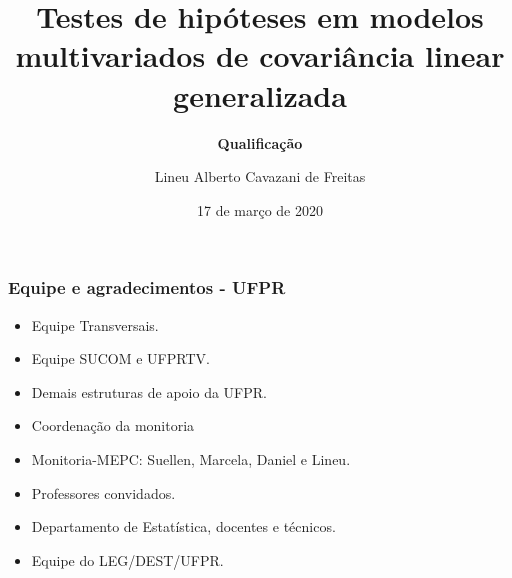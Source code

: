 \documentclass[handout,serif, professionalfont, usenames, dvipsnames, aspectratio = 169]{beamer}\usepackage[]{graphicx}\usepackage[]{color}
\title[TH · McGLM]{
  \LARGE Testes de hipóteses em modelos multivariados de covariância linear generalizada
}
\subtitle[]{
  \large {\bf Qualificação}
}
\author[Lineu Alberto $\cdot$ UFPR]{
      Lineu Alberto Cavazani de Freitas
      
}
\date{17 de março de 2020}
\begin{document}

\begin{frame}[plain]
   \titlepage
\end{frame}


\begin{frame}
  \frametitle{Equipe e agradecimentos - UFPR}
  \begin{itemize}
    \itemsep 2ex
  \item Equipe Transversais. 
  \item Equipe SUCOM e UFPRTV.
  \item Demais estruturas de apoio da UFPR.
  \item Coordenação da monitoria
  \item Monitoria-MEPC: Suellen, Marcela, Daniel e Lineu.
  \item Professores convidados.
  \item Departamento de Estatística, docentes e técnicos.
  \item Equipe do LEG/DEST/UFPR.
  \end{itemize}
\end{frame}
\end{document}
